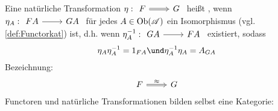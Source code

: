 Eine natürliche Transformation $\eta: \begin{tikzcd}
F \arrow[r, Rightarrow] & G
\end{tikzcd}$ heißt , wenn
$\eta_A: \begin{tikzcd}
FA \arrow[r] & GA
\end{tikzcd}$ für jedes $A \in \operatorname{Ob}(\mathscr A)$ ein Isomorphismus (vgl. \ref{def:Functorkat}) %
ist, d.h. wenn $\eta_A^{-1}: \begin{tikzcd}
GA \arrow[r] & FA
\end{tikzcd}$ existiert, sodass
\begin{align*}
	\eta_A \eta_A^{-1} = 1_{FA} \und \eta_A^{-1} \eta_A = A_{GA}
\end{align*}
Bezeichnung: 
\[
\begin{tikzcd}
	F \arrow[r, Rightarrow, "\approx"] & G
\end{tikzcd}
\]
Functoren und natürliche Transformationen bilden selbst eine Kategorie:
